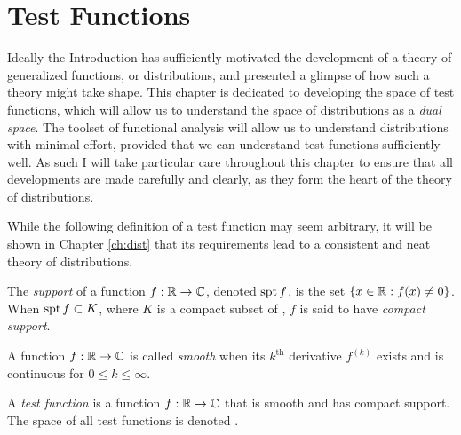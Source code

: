 \chapter{Test Functions}
\label{ch:test}

  Ideally the Introduction has sufficiently motivated the development of a theory of generalized functions, or distributions, and presented a glimpse of how such a theory might take shape.
  This chapter is dedicated to developing the space of test functions, which will allow us to understand the space of distributions as a \emph{dual space}.
  The toolset of functional analysis will allow us to understand distributions with minimal effort, provided that we can understand test functions sufficiently well.
  As such I will take particular care throughout this chapter to ensure that all developments are made carefully and clearly, as they form the heart of the theory of distributions.


  While the following definition of a test function may seem arbitrary, it will be shown in Chapter \ref{ch:dist} that its requirements lead to a consistent and neat theory of distributions.
  \begin{defn}
    The \emph{support} of a function $f:\mathbb{R}\rightarrow\mathbb{C}$, denoted $\operatorname{spt} f$, is the set $\{x\in\mathbb{R}: f(x)\ne0\}$.
    When $\operatorname{spt} f \subset K$, where $K$ is a compact subset of \R, $f$ is said to have \emph{compact support}.
  \end{defn}
  \begin{defn}
    A function $f:\mathbb{R}\rightarrow\mathbb{C}$ is called \emph{smooth} when its $k^\text{th}$ derivative $f^{(k)}$ exists and is continuous for $0\le k \le\infty$.
  \end{defn}
  \begin{defn}
    A \emph{test function} is a function $f:\mathbb{R}\rightarrow\mathbb{C}$ that is smooth and has compact support.
    The space of all test functions is denoted \D.
  \end{defn}

